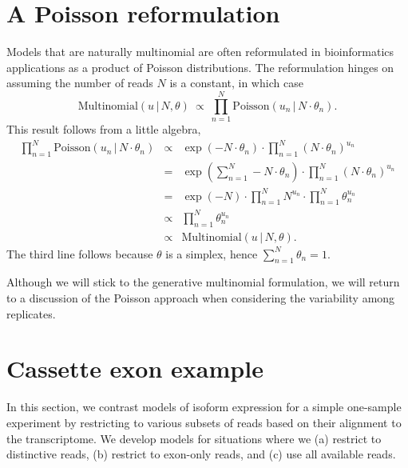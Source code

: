 \documentclass[11pt]{report}
\newcommand{\distro}[3]{\textrm{#1}\!\left( #2 \,|\, #3\right)}
\begin{document}
\section{A Poisson reformulation}

Models that are naturally multinomial are often reformulated in
bioinformatics applications as a product of Poisson distributions.
The reformulation hinges on assuming the number of reads $N$ is a
constant, in which case
\[
  \textstyle
  \distro{Multinomial}{u}{N, \theta}
  \ \propto \
  \prod_{n=1}^N \distro{Poisson}{u_n}{N \cdot \theta_n}.
\]
This result follows from a little algebra, 
\begin{eqnarray*}
  \textstyle \prod_{n=1}^N \distro{Poisson}{u_n}{N \cdot \theta_n}
  & \propto & \exp(-N \cdot \theta_n)
              \cdot \textstyle \prod_{n=1}^N (N \cdot \theta_n)^{u_n}
  \\[4pt]
  & = & \textstyle \exp\!\left( \sum_{n=1}^N -N \cdot \theta_n \right)
        \cdot \prod_{n=1}^N (N \cdot \theta_n)^{u_n}
  \\[4pt]
  & = & \textstyle \exp(-N) \cdot \prod_{n=1}^N N^{u_n} \cdot \prod_{n=1}^N \theta_n^{u_n}
  \\[4pt]
  & \propto & \textstyle \prod_{n=1}^N \theta_n^{u_n}
  \\[4pt]
  & \propto & \distro{Multinomial}{u}{N, \theta}.
\end{eqnarray*}
The third line follows because $\theta$ is a simplex, hence $\sum_{n=1}^N
\theta_n = 1$.

Although we will stick to the generative multinomial formulation, we
will return to a discussion of the Poisson approach when considering
the variability among replicates.


\section{Cassette exon example}

In this section, we contrast models of isoform expression for a simple
one-sample experiment by restricting to various subsets of reads based
on their alignment to the transcriptome.  We develop models for
situations where we (a) restrict to distinctive reads, (b) restrict to
exon-only reads, and (c) use all available reads.
\end{document}
